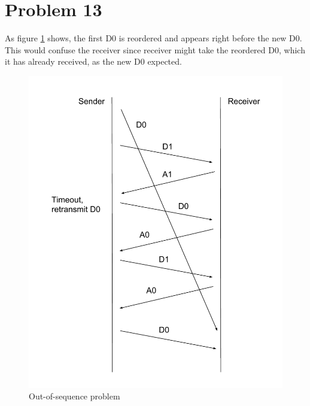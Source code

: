 \documentclass[titlepage, paper=a4, fontsize=11pt]{scrartcl} %
\numberwithin{equation}{section} %
\numberwithin{table}{section} %
\begin{document}
\section*{Problem 13}
As figure \ref{fig:p13} shows, the first D0 is reordered and appears right before the new D0.
This would confuse the receiver since receiver might take the reordered D0, which it has already received,
as the new D0 expected.
\begin{figure}[!ht]
    \includegraphics[width=\textwidth]{images/P13.pdf}
    \caption{Out-of-sequence problem}
    \label{fig:p13}
\end{figure}
\\


\end{document}

